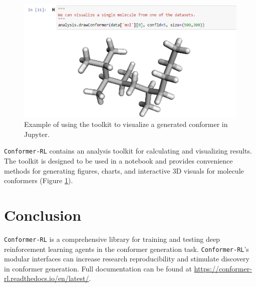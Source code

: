 \documentclass[twoside,11pt]{article}
\newcommand{\code}[1]{\texttt{#1}}
\newcommand{\titleofpaper}{Conformer-RL}
\begin{document}
\begin{figure}[h]
  \centering
  \includegraphics[scale=0.75]{molecules.png}
  \caption{
    Example of using the toolkit to visualize a generated conformer in Jupyter.
  }
  \label{fig:molecules}
\end{figure}

\code{\titleofpaper} contains an analysis toolkit for calculating and visualizing results. The toolkit is designed to be used in a notebook and provides convenience methods for generating figures, charts, and interactive 3D visuals for molecule conformers (Figure \ref{fig:molecules}).

\section{Conclusion}
\code{\titleofpaper} is a comprehensive library for training and testing deep reinforcement learning agents in the conformer generation task. \code{\titleofpaper}'s modular interfaces can increase research reproducibility and stimulate discovery in conformer generation. Full documentation can be found at \url{https://conformer-rl.readthedocs.io/en/latest/}.



\newpage


\vskip 0.2in




\newpage

\end{document}
